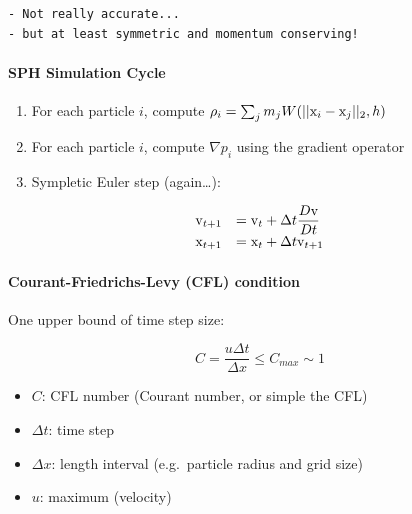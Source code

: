 \documentclass[11pt]{article}
\providecommand{\tightlist}{%
      \setlength{\itemsep}{0pt}\setlength{\parskip}{0pt}}
\begin{document}
\begin{verbatim}
- Not really accurate...
- but at least symmetric and momentum conserving!
\end{verbatim}

\hypertarget{sph-simulation-cycle}{%
\paragraph{SPH Simulation Cycle}\label{sph-simulation-cycle}}

\begin{enumerate}
\def\labelenumi{\arabic{enumi}.}
\tightlist
\item
  For each particle \(i\), compute
  \(\rho_{i}=\sum_{j}m_{j}W(||{\rm x}_ {i} - {\rm x} _{j}||_{2}, h)\)
\item
  For each particle \(i\), compute \(\nabla p_{i}\) using the gradient
  operator
\item
  Sympletic Euler step (again\ldots):
\end{enumerate}

\begin{equation*}
\begin{array}{rl}
    {\rm v}_ {t+1} &={\rm v}_ {t}+\Delta t\displaystyle\frac{D{\rm v}}{Dt} \\
    {\rm x}_ {t+1} &={\rm x}_ {t}+\Delta t{\rm v}_{t+1}
\end{array}
\end{equation*}

\hypertarget{courant-friedrichs-levy-cfl-condition}{%
\paragraph{Courant-Friedrichs-Levy (CFL)
condition}\label{courant-friedrichs-levy-cfl-condition}}

One upper bound of time step size:

\begin{equation*}
C=\frac{u\Delta t}{\Delta x}\le C_{max}\sim 1
\end{equation*}
\begin{itemize}
  \item \(C\): CFL number (Courant number, or simple the CFL)
  \item \(\Delta t\): time step
  \item \(\Delta x\): length interval (e.g.~particle radius and grid size)
  \item \(u\): maximum (velocity)
\end{itemize}
\end{document}

